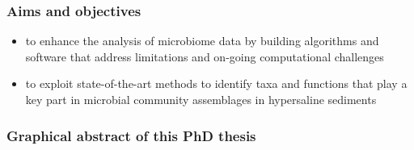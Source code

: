 \documentclass{beamer}
\begin{document}
   \begin{frame}
      \frametitle{Aims and objectives}
      \begin{itemize}
         \item \small to enhance the analysis of microbiome data by building algorithms and software
         that address limitations and on-going computational challenges
         \bigskip
         \item  to exploit state-of-the-art methods to identify taxa and functions that play a key
         part in microbial community assemblages in hypersaline sediments
      \end{itemize}

   \end{frame}

   \begin{frame}
      \frametitle{Graphical abstract of this PhD thesis}

   \end{frame}
\end{document}
